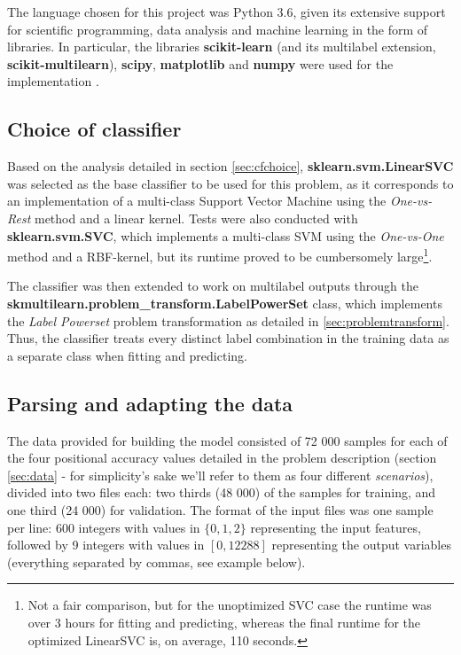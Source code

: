 \documentclass{kthreport}
\theoremstyle{definition}
\begin{document}
The language chosen for this project was Python 3.6, given its extensive support for scientific programming, data analysis and machine learning in the form of libraries. In particular, the libraries \textbf{scikit-learn} (and its multilabel extension, \textbf{scikit-multilearn}), \textbf{scipy}, \textbf{matplotlib} and \textbf{numpy} were used for the implementation \autocite{scikit-learn,scikit-multilearn,scipy,matplotlib,numpy}.

\subsection{Choice of classifier}

Based on the analysis detailed in section \ref{sec:cfchoice}, \textbf{sklearn.svm.LinearSVC} was selected as the base classifier to be used for this problem, as it corresponds to an implementation of a multi-class Support Vector Machine using the \emph{One-vs-Rest} method and a linear kernel. Tests were also conducted with \textbf{sklearn.svm.SVC}, which implements a multi-class SVM using the \emph{One-vs-One} method and a RBF-kernel, but its runtime proved to be cumbersomely large\footnote{Not a fair comparison, but for the unoptimized SVC case the runtime was over 3 hours for fitting and predicting, whereas the final runtime for the optimized LinearSVC is, on average, 110 seconds.}.

The classifier was then extended to work on multilabel outputs through the \textbf{skmultilearn.problem\_transform.LabelPowerSet} class, which implements the \emph{Label Powerset} problem transformation as detailed in \ref{sec:problemtransform}. 
Thus, the classifier treats every distinct label combination in the training data as a separate class when fitting and predicting.

\subsection{Parsing and adapting the data}

The data provided for building the model consisted of 72 000 samples for each of the four positional accuracy values detailed in the problem description (section \ref{sec:data} - for simplicity's sake we'll refer to them as four different \emph{scenarios}), divided into two files each: two thirds (48 000) of the samples for training, and one third (24 000) for validation. The format of the input files was one sample per line: 600 integers with values in $\{0, 1, 2\}$ representing the input features, followed by 9 integers with values in $[0, 12288]$ representing the output variables (everything separated by commas, see example below).
\end{document}
